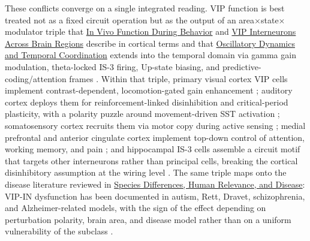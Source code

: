 \documentclass[11pt]{article}
\begin{document}
These conflicts converge on a single integrated reading. VIP function is best treated not as a fixed circuit operation but as the output of an area$\times$state$\times$modulator triple that \href{/in-vivo-behavior}{In Vivo Function During Behavior} and \href{/cross-areas}{VIP Interneurons Across Brain Regions} describe in cortical terms and that \href{/oscillatory-dynamics}{Oscillatory Dynamics and Temporal Coordination} extends into the temporal domain via gamma gain modulation, theta-locked IS-3 firing, Up-state biasing, and predictive-coding/attention frames \citep{Veit2023, Cichon2017, Hertag2020, Hertag2021, Shipp2016, Francavilla2018a, Tyan2014, Tricoire2011, Gulyas1996}. Within that triple, primary visual cortex VIP cells implement contrast-dependent, locomotion-gated gain enhancement \citep{Fu2014, Dipoppa2018, Pakan2016, Millman2020}; auditory cortex deploys them for reinforcement-linked disinhibition and critical-period plasticity, with a polarity puzzle around movement-driven SST activation \citep{Pi2013, Yavorska2021, Bigelow2019}; somatosensory cortex recruits them via motor copy during active sensing \citep{Lee2013, Sermet2019}; medial prefrontal and anterior cingulate cortex implement top-down control of attention, working memory, and pain \citep{Bastos2023a, Anastasiades2021a, Kamigaki2017, Li2022a}; and hippocampal IS-3 cells assemble a circuit motif that targets other interneurons rather than principal cells, breaking the cortical disinhibitory assumption at the wiring level \citep{Gulyas1996, Tyan2014, Tricoire2011, Kawaguchi1996, Francavilla2018a}. The same triple maps onto the disease literature reviewed in \href{/disease-translational}{Species Differences, Human Relevance, and Disease}: VIP-IN dysfunction has been documented in autism, Rett, Dravet, schizophrenia, and Alzheimer-related models, with the sign of the effect depending on perturbation polarity, brain area, and disease model rather than on a uniform vulnerability of the subclass \citep{Mossner2020, Goff2023, Mcfarlan2024a, Bhandari2024, Hall2015, Goel2025, Kranz2025, Goff2019}.
\end{document}
